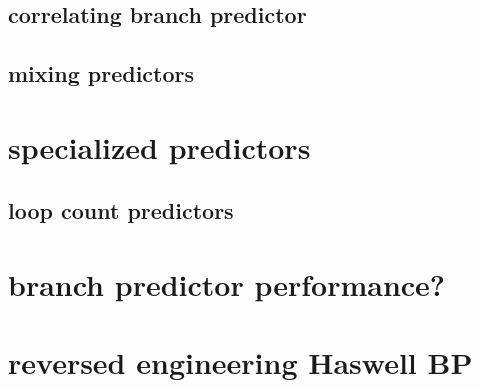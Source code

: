 \subsection{correlating branch predictor}

\subsection{mixing predictors}


\section{specialized predictors}
\subsection{loop count predictors}


\section{branch predictor performance?}


\section{reversed engineering Haswell BP}


